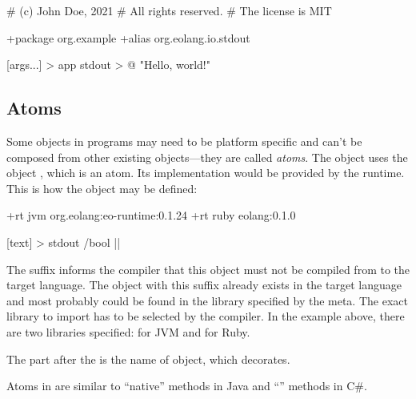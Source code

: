 \begin{ffcode}
# (c) John Doe, 2021
# All rights reserved.
# The license is MIT

+package org.example
+alias org.eolang.io.stdout

[args...] > app
  stdout > @
    "Hello, world!\n"
\end{ffcode}

\subsection{Atoms}

Some objects in \eo{} programs may need to be platform specific
and can't be composed from other existing objects---they are called
\emph{atoms}.
The object  uses the object ,
which is an atom. Its implementation would be provided by the
runtime. This is how the object may be defined:

\begin{ffcode}
+rt jvm org.eolang:eo-runtime:0.1.24
+rt ruby eolang:0.1.0

[text] > stdout /bool |$\label{ln:stdout}$|
\end{ffcode}

The  suffix informs the compiler that this object must
not be compiled from \eo{} to the target language. The object
with this suffix already exists in the target language and most
probably could be found in the library specified by the 
meta. The exact library to import has to be selected by the compiler.
In the example above, there are two libraries specified: for JVM and
for Ruby.

The  part after the \ff{/} is the name of
object, which  decorates.

Atoms in \eo{} are similar to ``native'' methods in Java and ``'' methods
in C\#.







